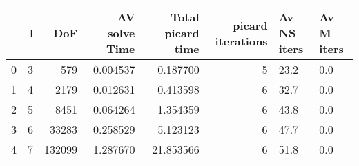 \begin{tabular}{lrrrrrll}
\toprule
{} &  l &     DoF &  AV solve Time &  Total picard time &  picard iterations & Av NS iters & Av M iters \\
\midrule
0 &  3 &     579 &       0.004537 &           0.187700 &                  5 &        23.2 &        0.0 \\
1 &  4 &    2179 &       0.012631 &           0.413598 &                  6 &        32.7 &        0.0 \\
2 &  5 &    8451 &       0.064264 &           1.354359 &                  6 &        43.8 &        0.0 \\
3 &  6 &   33283 &       0.258529 &           5.123123 &                  6 &        47.7 &        0.0 \\
4 &  7 &  132099 &       1.287670 &          21.853566 &                  6 &        51.8 &        0.0 \\
\bottomrule
\end{tabular}
